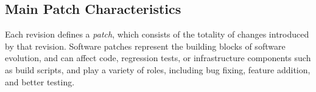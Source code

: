 \subsection{Main Patch Characteristics}

\begin{question}
  \rqtwo
\end{question}

Each revision defines a \textit{patch}, which consists of the totality
of changes introduced by that revision.  Software patches represent
the building blocks of software evolution, and 
can affect code, regression tests, or infrastructure components such
as build scripts, and play a variety of roles, including bug fixing,
feature addition, and better testing.  


